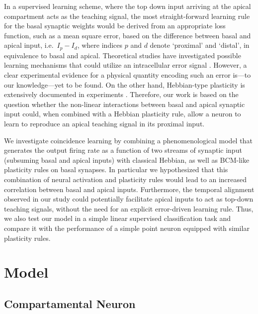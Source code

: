 \documentclass[utf8]{frontiersSCNS} %
\begin{document}
In a supervised learning scheme, where the top down input
arriving at the apical compartment acts as the teaching signal,
the most straight-forward learning rule for the basal synaptic
weights would be derived from an appropriate loss function,
such as a mean square error, based on the difference between 
basal and apical input, i.e.\ $I_p - I_d$,
where indices $p$ and $d$ denote `proximal' and
`distal', in equivalence to basal and apical. 
Theoretical studies have investigated possible 
learning mechanisms that could utilize an 
intracellular error signal
\citep{Urbanczik2014,Schiess2016,Guerguiev2017}.
However, a clear experimental
evidence for a physical quantity encoding such an error 
is---to our knowledge---yet to be found. 
On the other hand, Hebbian-type plasticity is extensively
documented in experiments 
\citep{Gustafsson1987,Debanne1994,Markram1997,Bi1998}. 
Therefore, our work is based on the question whether the 
non-linear interactions between basal and apical synaptic input could, 
when combined with a Hebbian plasticity rule, allow a neuron
to learn to reproduce an apical teaching signal in its
proximal input.

We investigate coincidence learning by
combining a phenomenological model that 
generates the output firing rate as a function 
of two streams of synaptic input (subsuming basal 
and apical inputs) with classical Hebbian, as well as 
BCM-like plasticity rules on basal synapses. 
In particular we hypothesized that this combination of neural 
activation and plasticity rules would lead to an
increased correlation between basal and apical inputs.
Furthermore, the temporal alignment observed in our study 
could potentially facilitate apical inputs to act as 
top-down teaching signals, without the need for an 
explicit error-driven learning rule. Thus, we also 
test our model in a simple linear supervised 
classification task and compare it with the 
performance of a simple point neuron equipped with 
similar plasticity rules.

\section{Model}
\label{sect:model}

\subsection{Compartamental Neuron}
\label{sect:neuronmodel}
\end{document}

